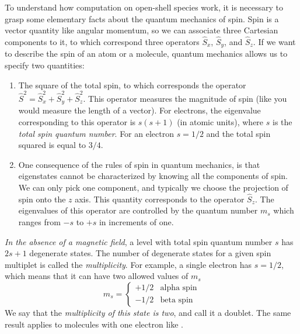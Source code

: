 \documentclass[../Main/chem371-notes.tex]{subfiles}
\begin{document}
To understand how computation on open-shell species work, it is necessary to grasp some elementary facts about the quantum mechanics of spin.
Spin is a vector quantity like angular momentum, so we can associate three Cartesian components to it, to which correspond three operators $\hat{S}_x$, $\hat{S}_y$, and $\hat{S}_z$.
If we want to describe the spin of an atom or a molecule, quantum mechanics allows us to specify two quantities:
\begin{enumerate}
\item The square of the total spin, to which corresponds the operator $\hat{S}^2 = \hat{S}_x^2 + \hat{S}_y^2 + \hat{S}_z^2$.
This operator measures the magnitude of spin (like you would measure the length of a vector).
For electrons, the eigenvalue corresponding to this operator is $s(s + 1)$ (in atomic units), where $s$ is the \emph{total spin quantum number}.
For an electron $s = 1/2$ and the total spin squared is equal to $3/4$.

\item One consequence of the rules of spin in quantum mechanics, is that eigenstates cannot be characterized by knowing all the components of spin.
We can only pick one component, and typically we choose the projection of spin onto the $z$ axis. This quantity corresponds to the operator $\hat{S}_z$.
The eigenvalues of this operator are controlled by the quantum number $m_s$ which ranges from $-s$ to $+s$ in increments of one.
\end{enumerate}
\emph{In the absence of a magnetic field}, a level with total spin quantum number $s$ has $2s + 1$ degenerate states. The number of degenerate states for a given spin multiplet is called the \emph{multiplicity}.
For example, a single electron has $s = 1/2$, which means that it can have two allowed values of $m_s$
\begin{equation}
m_s = \begin{cases}
+1/2 & \text{alpha spin} \\
-1/2 & \text{beta spin}
\end{cases}
\end{equation}
We say that the \emph{multiplicity of this state is two}, and call it a doublet.
The same result applies to molecules with one electron like .
\end{document}
